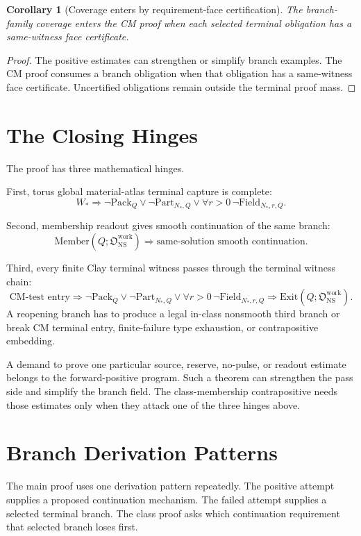 \documentclass[11pt]{article}
\newtheorem{corollary}{Corollary}
\newcommand{\NS}{\mathrm{NS}}
\newcommand{\Pack}{\mathrm{Pack}}
\newcommand{\Part}{\mathrm{Part}}
\newcommand{\Field}{\mathrm{Field}}
\newcommand{\Member}{\mathrm{Member}}
\newcommand{\Exit}{\mathrm{Exit}}
\newcommand{\Owork}{\mathfrak O_{\NS}^{\mathrm{work}}}
\begin{document}
\begin{corollary}[Coverage enters by requirement-face certification]
The branch-family coverage enters the CM proof when each selected terminal obligation has a same-witness face certificate.
\end{corollary}

\begin{proof}
The positive estimates can strengthen or simplify branch examples.
The CM proof consumes a branch obligation when that obligation has a same-witness face certificate.
Uncertified obligations remain outside the terminal proof mass.
\end{proof}

\section{The Closing Hinges}

The proof has three mathematical hinges.

First, torus global material-atlas terminal capture is complete:
\[
  W_*
  \Rightarrow
  \neg\Pack_Q
  \vee
  \neg\Part_{N_*,Q}
  \vee
  \forall r>0\,\neg\Field_{N_*,r,Q}.
\]

Second, membership readout gives smooth continuation of the same branch:
\[
  \Member(Q;\Owork)
  \Longrightarrow
  \text{same-solution smooth continuation.}
\]

Third, every finite Clay terminal witness passes through the terminal witness chain:
\[
  \text{CM-test entry}
  \Rightarrow
  \neg\Pack_Q\vee\neg\Part_{N_*,Q}\vee\forall r>0\,\neg\Field_{N_*,r,Q}
  \Rightarrow
  \Exit(Q;\Owork).
\]
A reopening branch has to produce a legal in-class nonsmooth third branch or break CM terminal entry, finite-failure type exhaustion, or contrapositive embedding.

A demand to prove one particular source, reserve, no-pulse, or readout estimate belongs to the forward-positive program.
Such a theorem can strengthen the pass side and simplify the branch field.
The class-membership contrapositive needs those estimates only when they attack one of the three hinges above.

\appendix

\section{Branch Derivation Patterns}

The main proof uses one derivation pattern repeatedly.
The positive attempt supplies a proposed continuation mechanism.
The failed attempt supplies a selected terminal branch.
The class proof asks which continuation requirement that selected branch loses first.
\end{document}
